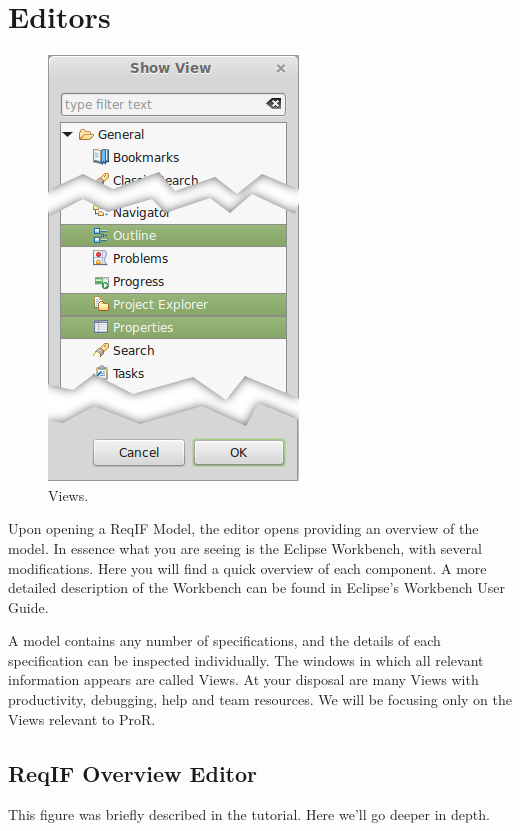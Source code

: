 \section{Editors}

\begin{figure}
\centering
\includegraphics[width=.3\textwidth]{../rmf-images/views_highlighted.png}
\caption{Views.}
\label{fig:Views}
\end{figure}

Upon opening a ReqIF Model, the editor opens providing an overview of the model.  In essence what you are seeing is the Eclipse Workbench, with several modifications.  Here you will find a quick overview of each component.  A more detailed description of the Workbench can be found in Eclipse's Workbench User Guide.

A model contains any number of specifications, and the details of each specification can be inspected individually.  The windows in which all relevant information appears are called Views.  At your disposal are many Views with productivity, debugging, help and team resources.  We will be focusing only on the Views relevant to ProR.

\subsection{ReqIF Overview Editor}

This figure was briefly described in the tutorial.  Here we'll go deeper in depth.

